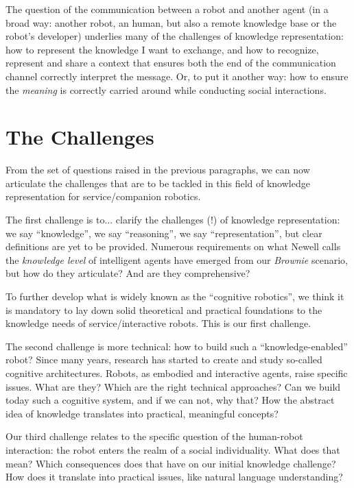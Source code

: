 The question of the communication between a robot and another agent (in a broad
way: another robot, an human, but also a remote knowledge base or the robot's
developer) underlies many of the challenges of knowledge representation: how to
represent the knowledge I want to exchange, and how to recognize, represent and
share a context that ensures both the end of the communication channel
correctly interpret the message. Or, to put it another way: how to ensure the
\emph{meaning} is correctly carried around while conducting social
interactions.


\section{The Challenges}
\label{sect|challenges}

From the set of questions raised in the previous paragraphs, we can now
articulate the challenges that are to be tackled in this field of knowledge
representation for service/companion robotics.

The first challenge is to... clarify the challenges (!) of knowledge
representation: we say ``knowledge'', we say ``reasoning'', we say
``representation'', but clear definitions are yet to be provided. Numerous
requirements on what Newell calls the \emph{knowledge level} of intelligent
agents have emerged from our \emph{Brownie} scenario, but how do they
articulate? And are they comprehensive?

To further develop what is widely known as the ``cognitive robotics'', we think
it is mandatory to lay down solid theoretical and practical foundations to the
knowledge needs of service/interactive robots. This is our first challenge.

The second challenge is more technical: how to build such a
``knowledge-enabled'' robot? Since many years, research has started to create
and study so-called cognitive architectures. Robots, as embodied and
interactive agents, raise specific issues. What are they? Which are the right
technical approaches? Can we build today such a cognitive system, and if we can
not, why that? How the abstract idea of knowledge translates into  practical,
meaningful concepts?

Our third challenge relates to the specific question of the human-robot
interaction: the robot enters the realm of a social individuality. What does
that mean? Which consequences does that have on our initial knowledge
challenge? How does it translate into practical issues, like natural language
understanding?

